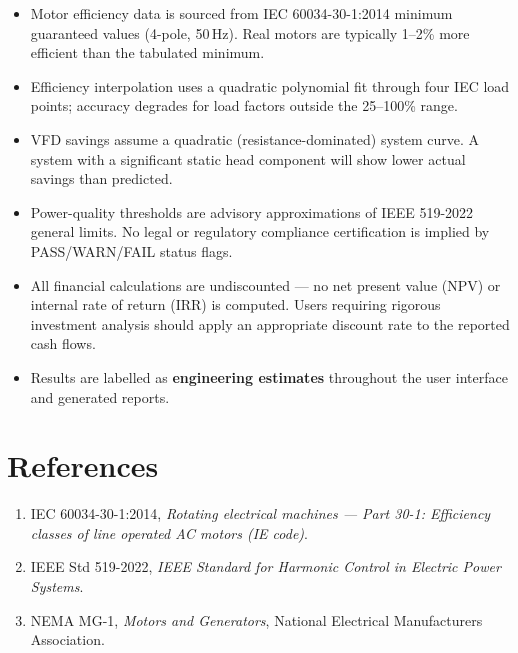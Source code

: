 \documentclass[11pt,a4paper]{article}
\begin{document}
\begin{itemize}
    \item Motor efficiency data is sourced from IEC 60034-30-1:2014 minimum
          guaranteed values (4-pole, 50\,Hz). Real motors are typically
          1--2\% more efficient than the tabulated minimum.
    \item Efficiency interpolation uses a quadratic polynomial fit through
          four IEC load points; accuracy degrades for load factors outside
          the 25--100\% range.
    \item VFD savings assume a quadratic (resistance-dominated) system
          curve. A system with a significant static head component will
          show lower actual savings than predicted.
    \item Power-quality thresholds are advisory approximations of IEEE
          519-2022 general limits. No legal or regulatory compliance
          certification is implied by PASS/WARN/FAIL status flags.
    \item All financial calculations are undiscounted --- no net present
          value (NPV) or internal rate of return (IRR) is computed. Users
          requiring rigorous investment analysis should apply an
          appropriate discount rate to the reported cash flows.
    \item Results are labelled as \textbf{engineering estimates} throughout
          the user interface and generated reports.
\end{itemize}

\section{References}

\begin{enumerate}
    \item IEC 60034-30-1:2014, \textit{Rotating electrical machines --- Part
          30-1: Efficiency classes of line operated AC motors (IE code)}.
    \item IEEE Std 519-2022, \textit{IEEE Standard for Harmonic Control in
          Electric Power Systems}.
    \item NEMA MG-1, \textit{Motors and Generators}, National Electrical
          Manufacturers Association.
\end{enumerate}
\end{document}
